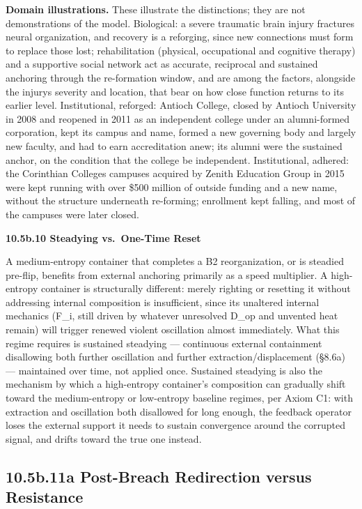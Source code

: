 \documentclass[
]{article}
\begin{document}
\textbf{Domain illustrations.} These illustrate the distinctions; they
are not demonstrations of the model. Biological: a severe traumatic
brain injury fractures neural organization, and recovery is a reforging,
since new connections must form to replace those lost; rehabilitation
(physical, occupational and cognitive therapy) and a supportive social
network act as accurate, reciprocal and sustained anchoring through the
re-formation window, and are among the factors, alongside the
injury\textquotesingle s severity and location, that bear on how close
function returns to its earlier level. Institutional, reforged: Antioch
College, closed by Antioch University in 2008 and reopened in 2011 as an
independent college under an alumni-formed corporation, kept its campus
and name, formed a new governing body and largely new faculty, and had
to earn accreditation anew; its alumni were the sustained anchor, on the
condition that the college be independent. Institutional, adhered: the
Corinthian Colleges campuses acquired by Zenith Education Group in 2015
were kept running with over \$500 million of outside funding and a new
name, without the structure underneath re-forming; enrollment kept
falling, and most of the campuses were later closed.

\textbf{10.5b.10 Steadying vs.~One-Time Reset}

A medium-entropy container that completes a B2 reorganization, or is
steadied pre-flip, benefits from external anchoring primarily as a speed
multiplier. A high-entropy container is structurally different: merely
righting or resetting it without addressing internal composition is
insufficient, since its unaltered internal mechanics (F\_i, still driven
by whatever unresolved D\_op and unvented heat remain) will trigger
renewed violent oscillation almost immediately. What this regime
requires is sustained steadying --- continuous external containment
disallowing both further oscillation and further extraction/displacement
(§8.6a) --- maintained over time, not applied once. Sustained steadying
is also the mechanism by which a high-entropy container's composition
can gradually shift toward the medium-entropy or low-entropy baseline
regimes, per Axiom C1: with extraction and oscillation both disallowed
for long enough, the feedback operator loses the external support it
needs to sustain convergence around the corrupted signal, and drifts
toward the true one instead.

\hypertarget{b.11a-post-breach-redirection-versus-resistance}{%
\subsection{10.5b.11a Post-Breach Redirection versus
Resistance}\label{b.11a-post-breach-redirection-versus-resistance}}
\end{document}
